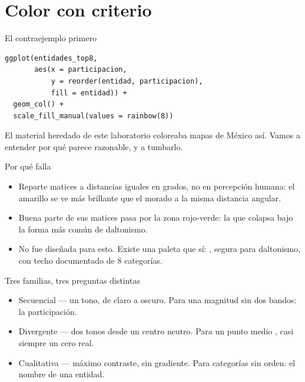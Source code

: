 \section{Color con criterio}

\begin{frame}[fragile]{El contraejemplo primero}
\begin{lstlisting}
ggplot(entidades_top8,
       aes(x = participacion,
           y = reorder(entidad, participacion),
           fill = entidad)) +
  geom_col() +
  scale_fill_manual(values = rainbow(8))
\end{lstlisting}

  \vspace{0.5em}
  {\small El material heredado de este laboratorio coloreaba mapas de
  México así. Vamos a entender por qué parece razonable, y a tumbarlo.}
\end{frame}

\begin{frame}{Por qué  falla}
  \vspace{0.3em}
  \begin{itemize}\setlength{\itemsep}{0.9em}
    \item<1-> Reparte matices a distancias iguales en \ac{grados}, no en
          percepción humana: el amarillo se ve más brillante que el
          morado a la misma distancia angular.
    \item<2-> Buena parte de sus matices pasa por la zona rojo-verde: la
          que colapsa bajo la forma más común de daltonismo.
    \item<3-> No fue diseñada para esto. Existe una paleta que sí:
          , segura para
          daltonismo, con techo documentado de 8 categorías.
  \end{itemize}
\end{frame}

\begin{frame}{Tres familias, tres preguntas distintas}
  \vspace{0.3em}
  \begin{itemize}\setlength{\itemsep}{0.85em}
    \item<1-> \ac{Secuencial} — un tono, de claro a oscuro. Para una
          magnitud sin dos bandos: la participación.
    \item<2-> \ac{Divergente} — dos tonos desde un centro neutro. Para
          un punto medio , casi siempre un cero real.
    \item<3-> \ac{Cualitativa} — máximo contraste, sin gradiente. Para
          categorías sin orden: el nombre de una entidad.
  \end{itemize}

  \vspace{1.0em}
\end{frame}

